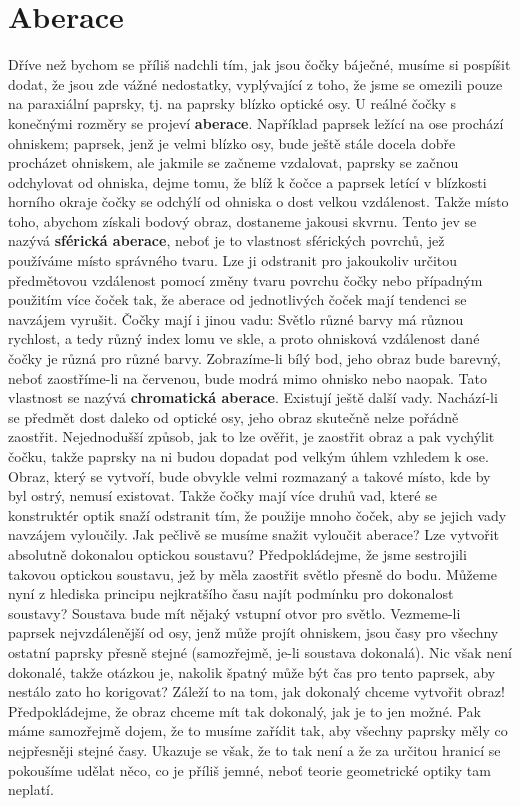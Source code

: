   \section{Aberace}\label{fyz:IchapXXVIIsecVI}
    Dříve než bychom se příliš nadchli tím, jak jsou čočky báječné, musíme si pospíšit dodat, že 
    jsou zde vážné nedostatky, vyplývající z toho, že jsme se omezili pouze na paraxiální paprsky, 
    tj. na paprsky blízko optické osy. U reálné čočky s konečnými rozměry se projeví 
    \textbf{aberace}. Například paprsek ležící na ose prochází ohniskem; paprsek, jenž je velmi 
    blízko osy, bude ještě stále docela dobře procházet ohniskem, ale jakmile se začneme vzdalovat, 
    paprsky se začnou odchylovat od ohniska, dejme tomu, že blíž k čočce a paprsek letící v 
    blízkosti horního okraje čočky se odchýlí od ohniska o dost velkou vzdálenost. Takže místo 
    toho, abychom získali bodový obraz, dostaneme jakousi skvrnu. Tento jev se nazývá 
    \textbf{sférická aberace}, neboť je to vlastnost sférických povrchů, jež používáme místo 
    správného tvaru. Lze ji odstranit pro jakoukoliv určitou předmětovou vzdálenost pomocí změny 
    tvaru povrchu čočky nebo případným použitím více čoček tak, že aberace od jednotlivých čoček 
    mají tendenci se navzájem vyrušit. Čočky mají i jinou vadu: Světlo různé barvy má různou 
    rychlost, a tedy různý index lomu ve skle, a proto ohnisková vzdálenost dané čočky je různá pro 
    různé barvy. Zobrazíme-li bílý bod, jeho obraz bude barevný, neboť zaostříme-li na červenou, 
    bude modrá mimo ohnisko nebo naopak. Tato vlastnost se nazývá \textbf{chromatická aberace}. 
    Existují ještě další vady. Nachází-li se předmět dost daleko od optické osy, jeho obraz 
    skutečně nelze pořádně zaostřit. Nejednodušší způsob, jak to lze ověřit, je zaostřit obraz a 
    pak vychýlit čočku, takže paprsky na ni budou dopadat pod velkým úhlem vzhledem k ose. Obraz, 
    který se vytvoří, bude obvykle velmi rozmazaný a takové místo, kde by byl ostrý, nemusí 
    existovat. Takže čočky mají více druhů vad, které se konstruktér optik snaží odstranit tím, že 
    použije mnoho čoček, aby se jejich vady navzájem vyloučily. Jak pečlivě se musíme snažit 
    vyloučit aberace? Lze vytvořit absolutně dokonalou optickou soustavu? Předpokládejme, že jsme 
    sestrojili takovou optickou soustavu, jež by měla zaostřit světlo přesně do bodu. Můžeme nyní z 
    hlediska principu nejkratšího času najít podmínku pro dokonalost soustavy? Soustava bude mít 
    nějaký vstupní otvor pro světlo. Vezmeme-li paprsek nejvzdálenější od osy, jenž může projít 
    ohniskem, jsou časy pro všechny ostatní paprsky přesně stejné (samozřejmě, je-li soustava 
    dokonalá). Nic však není dokonalé, takže otázkou je, nakolik špatný může být čas pro tento 
    paprsek, aby nestálo zato ho korigovat? Záleží to na tom, jak dokonalý chceme vytvořit obraz! 
    Předpokládejme, že obraz chceme mít tak dokonalý, jak je to jen možné. Pak máme samozřejmě 
    dojem, že to musíme zařídit tak, aby všechny paprsky měly co nejpřesněji stejné časy. Ukazuje 
    se však, že to tak není a že za určitou hranicí se pokoušíme udělat něco, co je příliš jemné, 
    neboť teorie geometrické optiky tam neplatí. 
    
